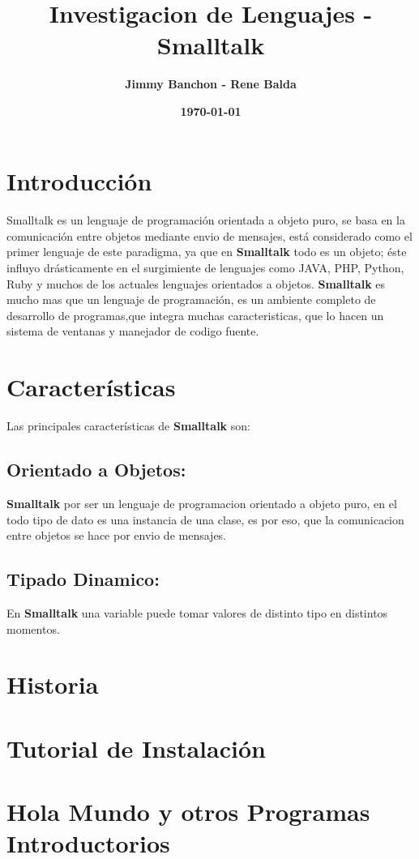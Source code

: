 \documentclass[11pt]{article}
\title{\textbf{Investigacion de Lenguajes - Smalltalk}}
\author{\textbf{Jimmy Banchon - Rene Balda}}
\date{\textbf{\today}}
\begin{document}
\maketitle
\section{\textbf{Introducción}} 
\paragraph{} \noindent
Smalltalk es un lenguaje de programación orientada a objeto puro, se basa en la comunicación entre objetos mediante envio de mensajes, está considerado como el primer lenguaje de este paradigma, ya que  en \textbf{Smalltalk} todo es un objeto; éste influyo drásticamente en el surgimiente de lenguajes como JAVA, PHP, Python, Ruby y muchos de los actuales lenguajes orientados a objetos.
 \textbf{Smalltalk} es mucho mas que un lenguaje de programación, es un ambiente completo de desarrollo de programas,que integra muchas caracteristicas, que lo hacen un sistema de ventanas y manejador de codigo fuente.
\section{\textbf{Características}}
Las principales características de  \textbf{Smalltalk} son:
\subsection{\textbf{Orientado a Objetos:}}
\textbf{Smalltalk} por ser un lenguaje de programacion orientado a objeto puro, en el todo tipo de dato es una instancia de una clase, es por eso, que la comunicacion entre objetos se hace por envio de mensajes.
\subsection{\textbf{Tipado Dinamico:}}
En \textbf{Smalltalk} una variable puede tomar valores de distinto tipo en distintos momentos. 

\section{Historia}
\section{Tutorial de Instalación}
\section{Hola Mundo y otros Programas Introductorios}
\end{document}
